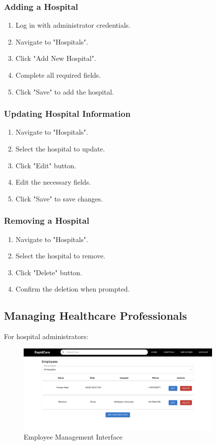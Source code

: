 \documentclass[12pt, titlepage]{article}
\begin{document}
\subsubsection{Adding a Hospital}
\begin{enumerate}
\item Log in with administrator credentials.
\item Navigate to "Hospitals".
\item Click "Add New Hospital".
\item Complete all required fields.
\item Click "Save" to add the hospital.
\end{enumerate}

\subsubsection{Updating Hospital Information}
\begin{enumerate}
\item Navigate to "Hospitals".
\item Select the hospital to update.
\item Click "Edit" button.
\item Edit the necessary fields.
\item Click "Save" to save changes.
\end{enumerate}

\subsubsection{Removing a Hospital}
\begin{enumerate}
\item Navigate to "Hospitals".
\item Select the hospital to remove.
\item Click "Delete" button.
\item Confirm the deletion when prompted.
\end{enumerate}

\newpage

\subsection{Managing Healthcare Professionals}
For hospital administrators:

\begin{figure}[H]
\centering
\includegraphics[width=0.9\textwidth]{employee.png}
\caption{Employee Management Interface}
\label{fig:Employee Management Interface}
\end{figure}
\end{document}
